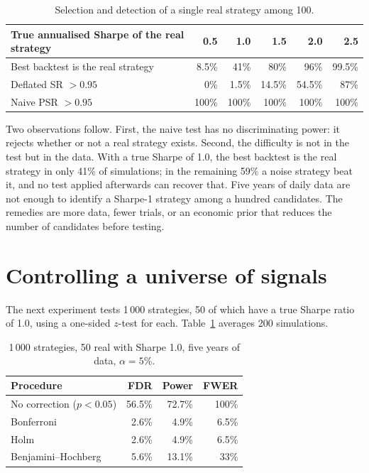 \documentclass[11pt,a4paper,oneside]{report}
\begin{document}
\begin{table}[H]\centering\small
\begin{tabular}{lrrrrr}
\toprule
True annualised Sharpe of the real strategy & 0.5 & 1.0 & 1.5 & 2.0 & 2.5\\
\midrule
Best backtest is the real strategy & 8.5\% & 41\% & 80\% & 96\% & 99.5\%\\
Deflated SR $>0.95$ & 0\% & 1.5\% & 14.5\% & 54.5\% & 87\%\\
Naive PSR $>0.95$ & 100\% & 100\% & 100\% & 100\% & 100\%\\
\bottomrule
\end{tabular}
\caption{Selection and detection of a single real strategy among 100.}
\end{table}

Two observations follow. First, the naive test has no discriminating power: it rejects whether or not a real strategy exists. Second, the difficulty is not in the test but in the data. With a true Sharpe of 1.0, the best backtest is the real strategy in only 41\% of simulations; in the remaining 59\% a noise strategy beat it, and no test applied afterwards can recover that. Five years of daily data are not enough to identify a Sharpe-1 strategy among a hundred candidates. The remedies are more data, fewer trials, or an economic prior that reduces the number of candidates before testing.

\section{Controlling a universe of signals}
The next experiment tests 1\,000 strategies, 50 of which have a true Sharpe ratio of 1.0, using a one-sided $z$-test for each. Table~\ref{tab:mt} averages 200 simulations.

\begin{table}[H]\centering\small
\begin{tabular}{lrrr}
\toprule
Procedure & FDR & Power & FWER\\
\midrule
No correction ($p<0.05$) & 56.5\% & 72.7\% & 100\%\\
Bonferroni & 2.6\% & 4.9\% & 6.5\%\\
Holm & 2.6\% & 4.9\% & 6.5\%\\
Benjamini--Hochberg & 5.6\% & 13.1\% & 33\%\\
\bottomrule
\end{tabular}
\caption{1\,000 strategies, 50 real with Sharpe 1.0, five years of data, $\alpha=5\%$.}\label{tab:mt}
\end{table}
\end{document}
